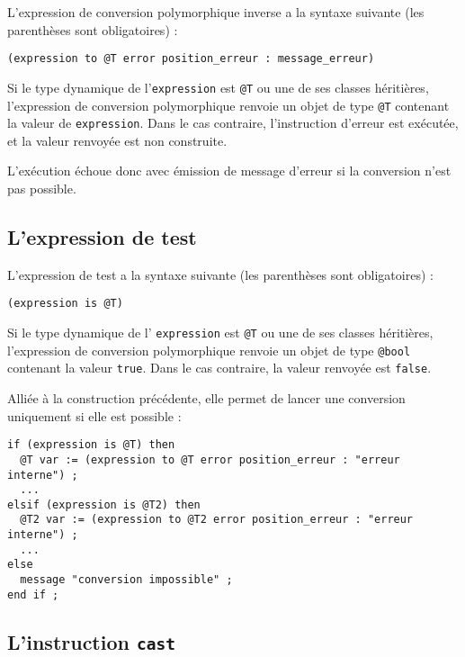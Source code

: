 L'expression de conversion polymorphique inverse a la syntaxe suivante (les parenthèses sont obligatoires) :

\begin{lstlisting}[language=galgas]
(expression to @T error position_erreur : message_erreur)
\end{lstlisting}

Si le type dynamique de l'\lstinline[language=galgas]{expression} est \lstinline[language=galgas]{@T} ou une de ses classes héritières, l'expression de conversion polymorphique renvoie un objet de type \lstinline[language=galgas]{@T} contenant la valeur de \lstinline[language=galgas]{expression}. Dans le cas contraire, l'instruction d'erreur est exécutée, et la valeur renvoyée est non construite.

L'exécution échoue donc avec émission de message d'erreur si la conversion n'est pas possible. 

\subsection{L'expression de test}

L'expression de test a la syntaxe suivante (les parenthèses sont obligatoires) :

\begin{lstlisting}[language=galgas]
(expression is @T)
\end{lstlisting}

Si le type dynamique de l' \lstinline[language=galgas]{expression} est \lstinline[language=galgas]{@T} ou une de ses classes héritières, l'expression de conversion polymorphique renvoie un objet de type \lstinline[language=galgas]{@bool} contenant la valeur \lstinline[language=galgas]{true}. Dans le cas contraire, la valeur renvoyée est \lstinline[language=galgas]{false}.

Alliée à la construction précédente, elle permet de lancer une conversion uniquement si elle est possible :

\begin{lstlisting}[language=galgas]
if (expression is @T) then
  @T var := (expression to @T error position_erreur : "erreur interne") ;
  ...
elsif (expression is @T2) then
  @T2 var := (expression to @T2 error position_erreur : "erreur interne") ;
  ...
else
  message "conversion impossible" ;
end if ;
\end{lstlisting}

\subsection{L'instruction \texttt{cast}}

